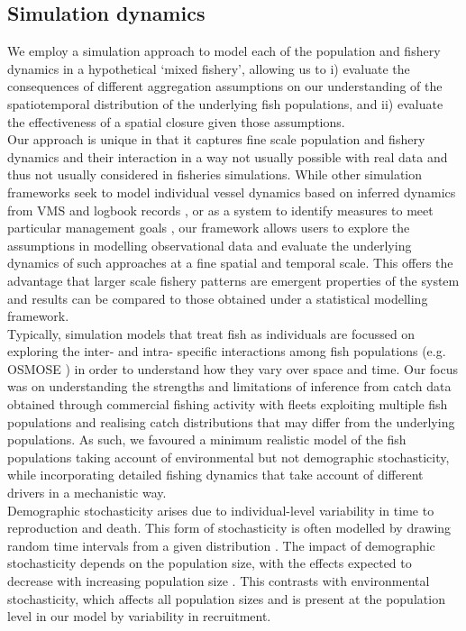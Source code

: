 \documentclass[review]{elsarticle}
\begin{document}
\subsection{Simulation dynamics}
 
We employ a simulation approach to model each of the population and fishery
dynamics in a hypothetical `mixed fishery', allowing us to i) evaluate the
consequences of different aggregation assumptions on our understanding of the
spatiotemporal distribution of the underlying fish populations, and ii)
evaluate the effectiveness of a spatial closure given those assumptions. \\

Our approach is unique in that it captures fine scale population and fishery
dynamics and their interaction in a way not usually possible with real data and
thus not usually considered in fisheries simulations. While other simulation
frameworks seek to model individual vessel dynamics based on inferred dynamics
from VMS and logbook records \citep{Bastardie2010}, or as a system to identify
measures to meet particular management goals \citep{Bailey2018}, our framework
allows users to explore the assumptions in modelling observational data and
evaluate the underlying dynamics of such approaches at a fine spatial and
temporal scale.  This offers the advantage that larger scale fishery patterns
are emergent properties of the system and results can be compared to those
obtained under a statistical modelling framework. \\

Typically, simulation models that treat fish as individuals are focussed on
exploring the inter- and intra- specific interactions among fish populations
(e.g. OSMOSE \cite{Shin2004}) in order to understand how they vary over space
and time. Our focus was on understanding the strengths and limitations of
inference from catch data obtained through commercial fishing activity with
fleets exploiting multiple fish populations and realising catch distributions
that may differ from the underlying populations. As such, we favoured a minimum
realistic model of the fish populations \citep{Plaganyi2014} taking account of
environmental but not demographic stochasticity, while incorporating detailed
fishing dynamics that take account of different drivers in a mechanistic way.
\\ 

Demographic stochasticity arises due to individual-level variability in time to
reproduction and death. This form of stochasticity is often modelled by drawing
random time intervals from a given distribution \citep{Gillespie1977}. The
impact of demographic stochasticity depends on the population size, with the
effects expected to decrease with increasing population size \citep{Lande2010}.
This contrasts with environmental stochasticity, which affects all population
sizes and is present at the population level in our model by variability in
recruitment. \\
\end{document}
